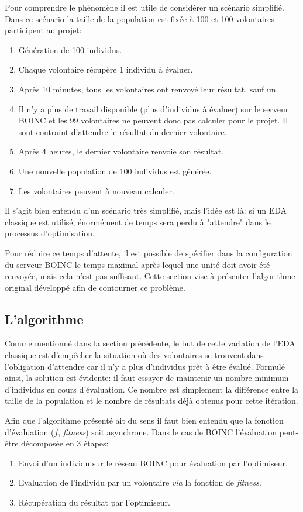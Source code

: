 \documentclass[a4paper, 11pt]{report}
\begin{document}
Pour comprendre le phénomène il est utile de considérer un scénario simplifié. Dans ce scénario la taille de la population est fixée à 100 et 100 volontaires participent au projet:
\begin{enumerate}[1)]
\item Génération de 100 individus.
\item Chaque volontaire récupère 1 individu à évaluer.
\item Après 10 minutes, tous les volontaires ont renvoyé leur résultat, sauf un.
\item Il n'y a plus de travail disponible (plus d'individus à évaluer) sur le serveur \textsc{BOINC} et les 99 volontaires ne peuvent donc pas calculer pour le projet. Il sont contraint d'attendre le résultat du dernier volontaire.
\item Après 4 heures, le dernier volontaire renvoie son résultat.
\item Une nouvelle population de 100 individus est générée.
\item Les volontaires peuvent à nouveau calculer.
\end{enumerate}
Il s'agit bien entendu d'un scénario très simplifié, mais l'idée est là: si un EDA classique est utilisé, énormément de temps sera perdu à "attendre" dans le processus d'optimisation. 

Pour réduire ce temps d'attente, il est possible de spécifier dans la configuration du serveur \textsc{BOINC} le temps maximal après lequel une unité doit avoir été renvoyée, mais cela n'est pas suffisant. Cette section vise à présenter l'algorithme original développé afin de contourner ce problème.

\subsection{L'algorithme}
Comme mentionné dans la section précédente, le but de cette variation de l'EDA classique est d'empêcher la situation où des volontaires se trouvent dans l'obligation d'attendre car il n'y a plus d'individus prêt à être évalué. Formulé ainsi, la solution est évidente: il faut essayer de maintenir un nombre minimum d'individus en cours d'évaluation. Ce nombre est simplement la différence entre la taille de la population et le nombre de résultats déjà obtenus pour cette itération. 

Afin que l'algorithme présenté ait du sens il faut bien entendu que la fonction d'évaluation ($f$, \textit{fitness}) soit asynchrone. Dans le cas de \textsc{BOINC} l'évaluation peut-être décomposée en 3 étapes:
\begin{enumerate}[1)]
\item Envoi d'un individu sur le réseau \textsc{BOINC} pour évaluation par l'optimiseur.
\item Evaluation de l'individu par un volontaire \textit{via} la fonction de \textit{fitness}.
\item Récupération du résultat par l'optimiseur.
\end{enumerate}
\end{document}
